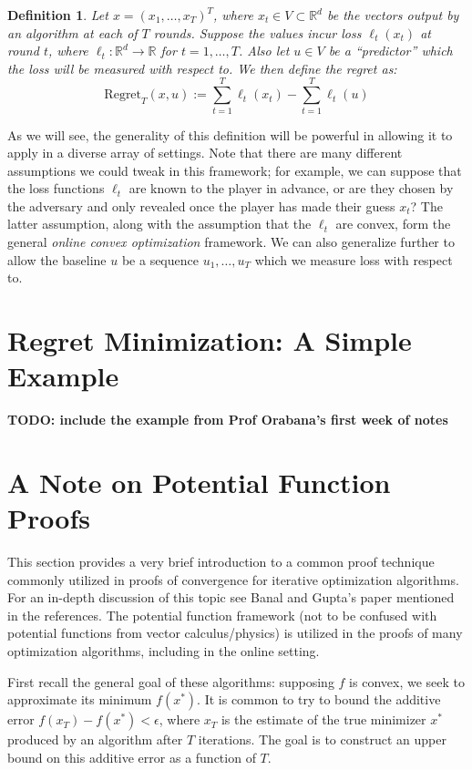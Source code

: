 \documentclass[12pt]{article}
\newcommand{\R}{\mathcal{R}}
\def\R{\mathbb{R}}
\newtheorem{definition}{Definition}
\begin{document}
\begin{definition}
Let $x = (x_1, \dots, x_T)^T$, where $x_t \in V \subset \R^d$ be the vectors output by an algorithm at each of $T$ rounds. Suppose the values incur loss $\ell_t(x_t)$ at round $t$, where $\ell_t: \R^d \to \R$
for $t = 1, \dots, T$. Also let $u \in V$ be a ``predictor'' which the loss will be measured with respect to. We then define the \textit{regret} as: 
\[\text{Regret}_T(x, u) := \sum_{t = 1}^{T} \ell_t(x_t) - \sum_{t = 1}^{T} \ell_t(u) \]
\end{definition}
As we will see, the generality of this definition will be powerful in allowing it to apply in a diverse array of settings. Note that there are many different assumptions we could tweak in this framework; for example, 
we can suppose that the loss functions $\ell_t$ are known to the player in advance, or are they chosen by the adversary and only revealed once the player has made their guess $x_t$? The latter assumption, along 
with the assumption that the $\ell_t$ are convex, form the general \textit{online convex optimization} framework. We can also generalize further to allow the baseline $u$ be a sequence $u_1, \dots, u_T$ which 
we measure loss with respect to. 

\section{Regret Minimization: A Simple Example}
\textbf{TODO: include the example from Prof Orabana's first week of notes}

\section{A Note on Potential Function Proofs}
This section provides a very brief introduction to a common proof technique commonly utilized in proofs of convergence for iterative optimization algorithms. For an in-depth discussion of this topic see 
Banal and Gupta's paper mentioned in the references. The potential function framework (not to be confused with potential functions from vector calculus/physics) is utilized in the proofs of many optimization algorithms, 
including in the online setting. 

First recall the general goal of these algorithms: supposing $f$ is convex, we seek to approximate its minimum $f(x^*)$. It is common to try to bound the additive error $f(x_T) - f(x^*) < \epsilon$, where $x_T$
is the estimate of the true minimizer $x^*$ produced by an algorithm after $T$ iterations. The goal is to construct an upper bound on this additive error as a function of $T$. 
\end{document}
